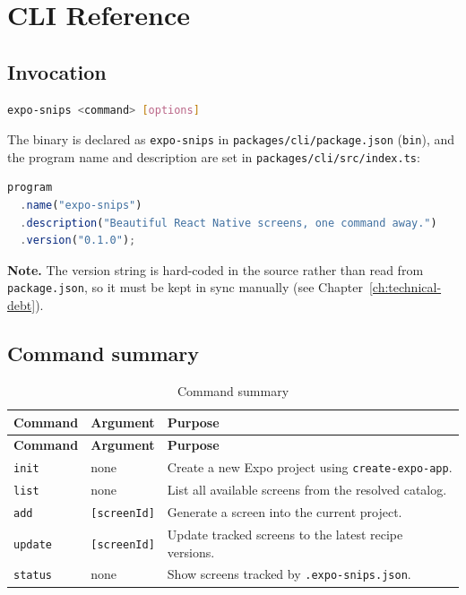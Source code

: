 \chapter{CLI Reference}
\label{ch:cli-reference}

\section{Invocation}

\begin{lstlisting}[language=bash]
expo-snips <command> [options]
\end{lstlisting}

The binary is declared as \texttt{expo-snips} in
\texttt{packages/cli/package.json} (\texttt{bin}), and the program name and
description are set in \texttt{packages/cli/src/index.ts}:

\begin{lstlisting}[language=JavaScript]
program
  .name("expo-snips")
  .description("Beautiful React Native screens, one command away.")
  .version("0.1.0");
\end{lstlisting}

\textbf{Note.} The version string is hard-coded in the source rather than read from
\texttt{package.json}, so it must be kept in sync manually (see
Chapter~\ref{ch:technical-debt}).

\section{Command summary}

\begin{longtable}{@{}L{2.1cm}L{3.1cm}L{8.6cm}@{}}
\caption{Command summary}\\
\toprule
\textbf{Command} & \textbf{Argument} & \textbf{Purpose} \\
\midrule
\endfirsthead
\toprule
\textbf{Command} & \textbf{Argument} & \textbf{Purpose} \\
\midrule
\endhead
\texttt{init} & none & Create a new Expo project using \texttt{create-expo-app}. \\
\texttt{list} & none & List all available screens from the resolved catalog. \\
\texttt{add} & \texttt{[screenId]} & Generate a screen into the current project. \\
\texttt{update} & \texttt{[screenId]} & Update tracked screens to the latest recipe versions. \\
\texttt{status} & none & Show screens tracked by \texttt{.expo-snips.json}. \\
\bottomrule
\end{longtable}

